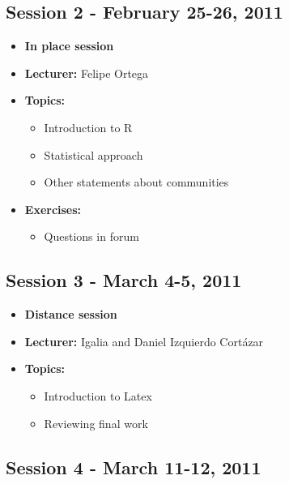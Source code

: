 \documentclass[a4paper]{article}
\begin{document}
\subsection{Session 2 - February 25-26, 2011}

\begin{itemize}
\item \textbf{In place session}
\item \textbf{Lecturer:} Felipe Ortega
\item \textbf{Topics:}
  \begin{itemize}
    \item Introduction to R 
    \item Statistical approach
    \item Other statements about communities
  \end{itemize}
\item \textbf{Exercises:}
  \begin{itemize}
    \item Questions in forum 
  \end{itemize}
\end{itemize}

\subsection{Session 3 - March 4-5, 2011}

\begin{itemize}
\item \textbf{Distance session}
\item \textbf{Lecturer:} Igalia and Daniel Izquierdo Cortázar
\item \textbf{Topics:}
  \begin{itemize}
   \item Introduction to Latex
   \item Reviewing final work
  \end{itemize}
\end{itemize}

\subsection{Session 4 - March 11-12, 2011}
\end{document}
